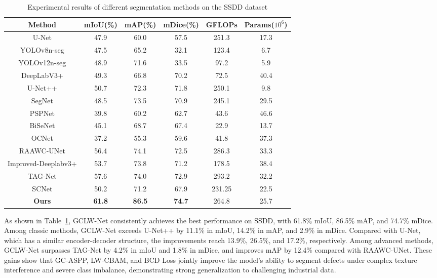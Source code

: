 \documentclass[sn-basic]{sn-jnl}
\theoremstyle{thmstyleone}%
\theoremstyle{thmstyletwo}%
\theoremstyle{thmstylethree}%
\begin{document}
\begin{table}[htbp]
\caption{Experimental results of different segmentation methods on the SSDD dataset}
\label{tab:ssdd_comparison}
\centering
\begin{tabular}{cccccc}
\toprule
Method & mIoU(\%) & mAP(\%) & mDice(\%) & GFLOPs & Params($10^6$) \\
\midrule
U-Net\cite{Jiao2020Refined} & 47.9 & 60.0 & 57.5 & 251.3 & 17.3 \\
YOLOv8n-seg \cite{Varghese2024YOLOv8}& 47.5 & 65.2 & 32.1 & 123.4 & 6.7 \\
YOLOv12n-seg \cite{Tian2025YOLOv12}& 48.9 & 71.6 & 33.5 & 97.2 & 5.9 \\
DeepLabV3+\cite{Chen2018Encoder} & 49.3 & 66.8 & 70.2 & 72.5 & 40.4 \\
U-Net++\cite{Zhou2018UNet} & 50.7 & 72.3 & 71.8 & 250.1 & 9.8 \\
SegNet\cite{Badrinarayanan2017SegNet} & 48.5 & 73.5 & 70.9 & 245.1 & 29.5 \\
PSPNet\cite{Zhao2017Pyramid} & 39.8 & 60.2 & 62.7 & 43.6 & 46.6 \\
BiSeNet\cite{Yu2018BiSeNet} & 45.1 & 68.7 & 67.4 & 22.9 & 13.7 \\
OCNet\cite{Yuan2018OCNet} & 37.2 & 55.3 & 59.6 & 41.8 & 37.3 \\
RAAWC-UNet\cite{Wang2024RAAWC} & 56.4 & 74.1 & 72.5 & 286.3 & 33.3 \\
Improved-Deeplabv3+\cite{Guclu2024Improved} & 53.7 & 73.8 & 71.2 & 178.5 & 38.4 \\
TAG-Net\cite{Jeong2025TAG} & 57.6 & 74.0 & 72.9 & 293.2 & 32.2 \\
SCNet\cite{Lin2025SCNet} & 50.2 & 71.2 & 67.9 & 231.25 & 22.5 \\
\midrule
\textbf{Ours} & \textbf{61.8} & \textbf{86.5} & \textbf{74.7} & 264.8 & 25.7 \\
\bottomrule
\end{tabular}
\end{table}

As shown in Table~\ref{tab:ssdd_comparison}, GCLW-Net consistently achieves the best performance on SSDD, with 61.8\% mIoU, 86.5\% mAP, and 74.7\% mDice. Among classic methods, GCLW-Net exceeds U-Net++ by 11.1\% in mIoU, 14.2\% in mAP, and 2.9\% in mDice. Compared with U-Net, which has a similar encoder-decoder structure, the improvements reach 13.9\%, 26.5\%, and 17.2\%, respectively. Among advanced methods, GCLW-Net surpasses TAG-Net by 4.2\% in mIoU and 1.8\% in mDice, and improves mAP by 12.4\% compared with RAAWC-UNet. These gains show that GC-ASPP, LW-CBAM, and BCD Loss jointly improve the model's ability to segment defects under complex texture interference and severe class imbalance, demonstrating strong generalization to challenging industrial data.
\end{document}
